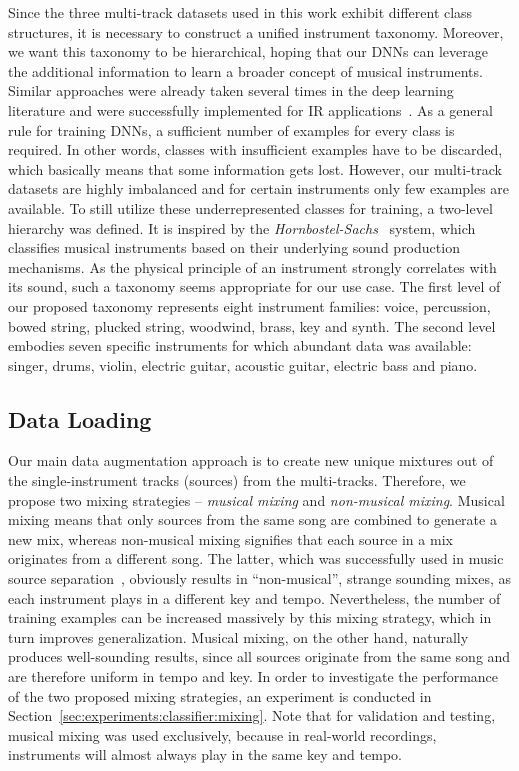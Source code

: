 \documentclass{article}
\begin{document}
Since the three multi-track datasets used in this work exhibit different class structures, it is necessary to construct a unified instrument taxonomy. Moreover, we want this taxonomy to be hierarchical, hoping that our DNNs can leverage the additional information to learn a broader concept of musical instruments. Similar approaches were already taken several times in the deep learning literature and were successfully implemented for IR applications~\cite{garcia2021leveraging}. As a general rule for training DNNs, a sufficient number of examples for every class is required. In other words, classes with insufficient examples have to be discarded, which basically means that some information gets lost. However, our multi-track datasets are highly imbalanced and for certain instruments only few examples are available. To still utilize these underrepresented classes for training, a two-level hierarchy was defined. It is inspired by the \textit{Hornbostel-Sachs}~\cite{hornbostel1914systematik} system, which classifies musical instruments based on their underlying sound production mechanisms. As the physical principle of an instrument strongly correlates with its sound, such a taxonomy seems appropriate for our use case. The first level of our proposed taxonomy represents eight instrument families: voice, percussion, bowed string, plucked string, woodwind, brass, key and synth. The second level embodies seven specific instruments for which abundant data was available: singer, drums, violin, electric guitar, acoustic guitar, electric bass and piano.

\subsection{Data Loading}
\label{sec:method:dataloading}
Our main data augmentation approach is to create new unique mixtures out of the single-instrument tracks (sources) from the multi-tracks. Therefore, we propose two mixing strategies -- \textit{musical mixing} and \textit{non-musical mixing}. Musical mixing means that only sources from the same song are combined to generate a new mix, whereas non-musical mixing signifies that each source in a mix originates from a different song. The latter, which was successfully used in music source separation~\cite{uhlich2017improving}, obviously results in \enquote{non-musical}, strange sounding mixes, as each instrument plays in a different key and tempo. Nevertheless, the number of training examples can be increased massively by this mixing strategy, which in turn improves generalization. Musical mixing, on the other hand, naturally produces well-sounding results, since all sources originate from the same song and are therefore uniform in tempo and key. In order to investigate the performance of the two proposed mixing strategies, an experiment is conducted in Section~\ref{sec:experiments:classifier:mixing}. Note that for validation and testing, musical mixing was used exclusively, because in real-world recordings, instruments will almost always play in the same key and tempo.
\end{document}
